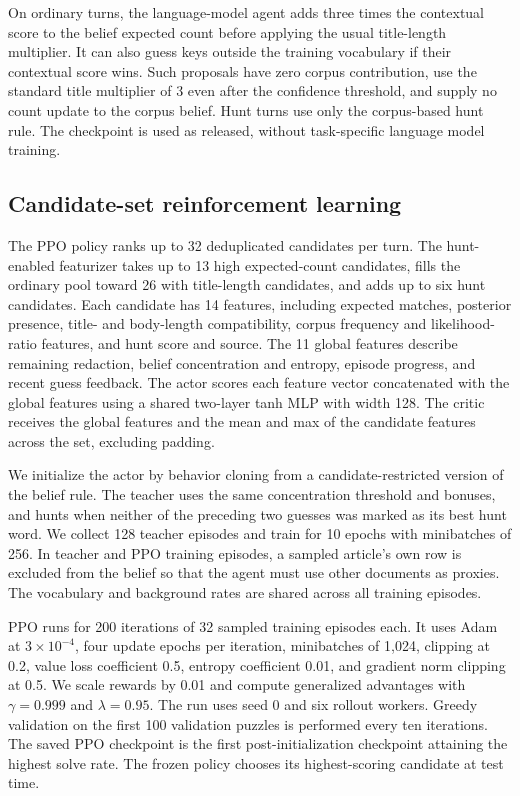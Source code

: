 \documentclass[conference]{IEEEtran}
\begin{document}
On ordinary turns, the language-model agent adds three times the contextual score to the belief expected count before applying the usual title-length multiplier. It can also guess keys outside the training vocabulary if their contextual score wins. Such proposals have zero corpus contribution, use the standard title multiplier of 3 even after the confidence threshold, and supply no count update to the corpus belief. Hunt turns use only the corpus-based hunt rule. The checkpoint is used as released, without task-specific language model training.

\subsection{Candidate-set reinforcement learning}
The PPO policy ranks up to 32 deduplicated candidates per turn. The hunt-enabled featurizer takes up to 13 high expected-count candidates, fills the ordinary pool toward 26 with title-length candidates, and adds up to six hunt candidates. Each candidate has 14 features, including expected matches, posterior presence, title- and body-length compatibility, corpus frequency and likelihood-ratio features, and hunt score and source. The 11 global features describe remaining redaction, belief concentration and entropy, episode progress, and recent guess feedback. The actor scores each feature vector concatenated with the global features using a shared two-layer tanh MLP with width 128. The critic receives the global features and the mean and max of the candidate features across the set, excluding padding.

We initialize the actor by behavior cloning from a candidate-restricted version of the belief rule. The teacher uses the same concentration threshold and bonuses, and hunts when neither of the preceding two guesses was marked as its best hunt word. We collect 128 teacher episodes and train for 10 epochs with minibatches of 256. In teacher and PPO training episodes, a sampled article's own row is excluded from the belief so that the agent must use other documents as proxies. The vocabulary and background rates are shared across all training episodes.

PPO runs for 200 iterations of 32 sampled training episodes each. It uses Adam at $3\times 10^{-4}$, four update epochs per iteration, minibatches of 1,024, clipping at 0.2, value loss coefficient 0.5, entropy coefficient 0.01, and gradient norm clipping at 0.5. We scale rewards by 0.01 and compute generalized advantages with $\gamma=0.999$ and $\lambda=0.95$. The run uses seed 0 and six rollout workers. Greedy validation on the first 100 validation puzzles is performed every ten iterations. The saved PPO checkpoint is the first post-initialization checkpoint attaining the highest solve rate. The frozen policy chooses its highest-scoring candidate at test time.
\end{document}

